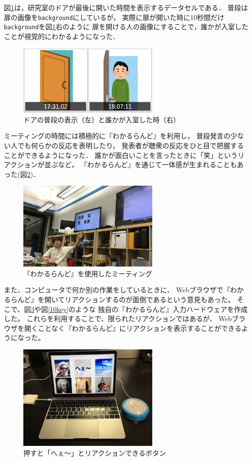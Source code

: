 図\ref{door}は，研究室のドアが最後に開いた時間を表示するデータセルである．
普段は扉の画像を\texttt{background}にしているが，
実際に扉が開いた時に10秒間だけ\texttt{background}を図\ref{door}右のように
扉を開ける人の画像にすることで，誰かが入室したことが視覚的にわかるようになった．

\begin{figure}[h]
\centering
\includegraphics[width=7cm]{images/door.png}
\caption{ドアの普段の表示（左）と誰かが入室した時（右）}
\label{door}
\end{figure}

ミーティングの時間には積極的に『わかるらんど』を利用し，
普段発言の少ない人でも何らかの反応を表明したり，
発表者が聴衆の反応をひと目で把握することができるようになった．
誰かが面白いことを言ったときに「笑」というリアクションが並ぶなど，
『わかるらんど』を通じて一体感が生まれることもあった(図\ref{wara})．

\begin{figure}[h]
\centering
\includegraphics[width=7cm]{images/wara.png}
\caption{『わかるらんど』を使用したミーティング}
\label{wara}
\end{figure}

また、コンピュータで何か別の作業をしているときに、
Webブラウザで『わかるらんど』を開いてリアクションするのが面倒であるという意見もあった。
そこで、図\ref{heebutton}や図\ref{10key}のような
独自の『わかるらんど』入力ハードウェアを作成した。
これらを利用することで、限られたリアクションではあるが、
Webブラウザを開くことなく『わかるらんど』にリアクションを表示することができるようになった。

\begin{figure}[h]
\centering
\includegraphics[width=7cm]{images/heebutton.png}
\caption{押すと「へぇ〜」とリアクションできるボタン}
\label{heebutton}
\end{figure}

